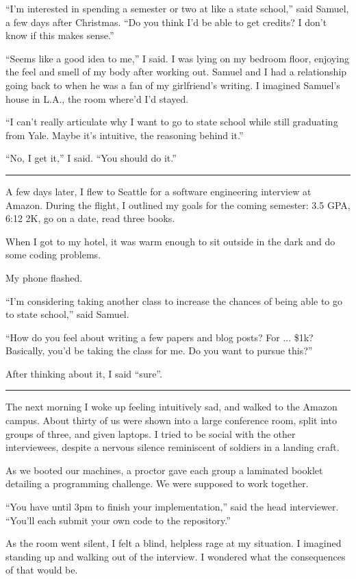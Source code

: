 ``I'm interested in spending a semester or two at like a state school,'' said
Samuel, a few days after Christmas.  ``Do you think I'd be able to get credits?  I don't know if this makes sense.''

``Seems like a good idea to me,'' I said.  I was lying on my bedroom floor,
enjoying the feel and smell of my body after working out.  Samuel and I had a
relationship going back to when he was a fan of my girlfriend's writing.  I
imagined Samuel's house in L.A., the room where'd I'd stayed.

``I can't really articulate why I want to go to state school while still
graduating from Yale.   Maybe it's intuitive, the reasoning behind it.'' 

``No, I get it,'' I said. ``You should do it.''

\plainfancybreak{12pt}{2}{* * *}

A few days later, I flew to Seattle for a software engineering interview at
Amazon.  During the flight, I outlined my goals for the coming semester: 3.5 GPA,
6:12 2K, go on a date, read three books.

When I got to my hotel, it was warm enough to sit outside in the dark and do
some coding problems. 

My phone flashed.

``I'm considering taking another class to increase the chances of being able to
go to state school,'' said Samuel.  

``How do you feel about writing a few papers and blog posts?  For ... \$1k?
Basically, you'd be taking the class for me.  Do you want to pursue this?'' 

After thinking about it, I said ``sure''.

\plainfancybreak{12pt}{2}{* * *}

The next morning I woke up feeling intuitively sad, and walked to the Amazon
campus.  About thirty of us were shown into a large conference room, split into
groups of three, and given laptops.  I tried to be social with the other
interviewees, despite a nervous silence reminiscent of soldiers in a landing
craft. 

As we booted our machines, a proctor gave each group a laminated booklet
detailing a programming challenge.  We were supposed to work together.

``You have until 3pm to finish your implementation,'' said the head interviewer.
``You'll each submit your own code to the repository.''

As the room went silent, I felt a blind, helpless rage at my situation.  I
imagined standing up and walking out of the interview.  I wondered what the
consequences of that would be.  

